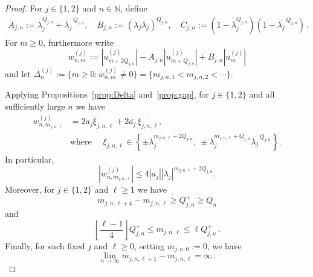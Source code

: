 \documentclass[a4paper,UKenglish,cleveref, autoref, thm-restate]{lipics-v2021}
\begin{document}
\begin{proof}
For \(j\in\{1,2\}\) and \(n\in\mathbb N\), define
\begin{gather}
  A_{j,n}  := \lambda_j^{Q_{j,n}}  +
  \overline{\lambda_j}^{\,Q_{j,n}},
  \quad
  B_{j,n}
  :=
  (\lambda_j\overline{\lambda_j})^{Q_{j,n}}, \quad
  C_{j,n}
  :=
  (1-\lambda_j^{Q_{j,n}})
  (1-\overline{\lambda_j}^{\,Q_{j,n}}) \, .
\label{eq:abc}
\end{gather}
For \(m\ge0\), furthermore write
\begin{equation}\label{eq:two-w}
  w_{n,m}^{(j)} :=
  |u_{m+2Q_{j,n}}^{(j)}| -
  A_{j,n}|u_{m+Q_{j,n}}^{(j)}| +
  B_{j,n}|u_m^{(j)}|
\end{equation}
and let
\(
  \Delta_n^{(j)}
  :=
  \{m\ge0:w_{n,m}^{(j)}\ne0\}
  =
  \{m_{j,n,1}<m_{j,n,2}<\cdots\}
\).

Applying Propositions~\ref{prop:Delta} and~\ref{prop:gap}, for $j \in \{1,2\}$ and
all sufficiently large \(n\) we have
\begin{equation}\label{eq:two-error-expansion}
\begin{aligned}
  w_{n,m_{j,n,\ell}}^{(j)}
  &= 2a_j\xi_{j,n,\ell}
     + 2\overline{a_j}\,\overline{\xi_{j,n,\ell}},
  \\
  &\text{where }\quad
  \xi_{j,n,\ell}
  \in
  \left\{
    \pm\lambda_j^{m_{j,n,\ell}+2Q_{j,n}},
    \ 
    \pm\lambda_j^{m_{j,n,\ell}+Q_{j,n}}
    \overline{\lambda_j}^{\,Q_{j,n}}
  \right\}.
\end{aligned}
\end{equation}
In particular,
\begin{equation}\label{eq:two-error-size}
  |w_{n,m_{j,n,\ell}}^{(j)}|
  \le
  4|a_j||\lambda_j|^{m_{j,n,\ell}+2Q_{j,n}}.
\end{equation}
Moreover, for $j\in\{1,2\}$ and $\ell\geq 1$ we have
\begin{equation}\label{eq:two-four-gap}
  m_{j,n,\ell+4}-m_{j,n,\ell}
  \ge Q_{j,n}^{+}\ge Q_n
\end{equation}
and
\begin{equation}\label{eq:two-index-bounds}
  \left\lfloor\frac{\ell-1}{4}\right\rfloor
  Q_{j,n}^{+}
  \le
  m_{j,n,\ell}
  \le
  \ell Q_{j,n}^{+} \, .
\end{equation}
Finally, for each fixed \(j\) and \(\ell\ge0\), setting $ m_{j,n,0}:=0$, we have
\begin{equation}\label{eq:two-fixed-gaps}
 \lim_{n\rightarrow\infty} m_{j,n,\ell+1}-m_{j,n,\ell}
  =\infty\, .
\end{equation}


\end{proof}
\end{document}
